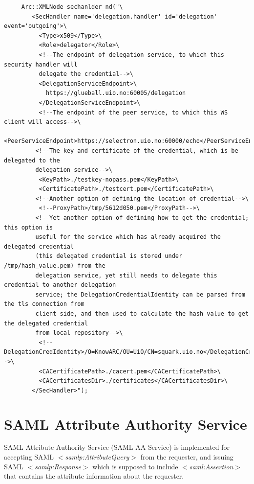 \documentclass{article}                            %
\begin{document}
\begin{verbatim}
     Arc::XMLNode sechanlder_nd("\ 
        <SecHandler name='delegation.handler' id='delegation' event='outgoing'>\ 
          <Type>x509</Type>\ 
          <Role>delegator</Role>\ 
          <!--The endpoint of delegation service, to which this security handler will 
          delegate the credential-->\
          <DelegationServiceEndpoint>\
            https://glueball.uio.no:60005/delegation
          </DelegationServiceEndpoint>\ 
          <!--The endpoint of the peer service, to which this WS client will access-->\
          <PeerServiceEndpoint>https://selectron.uio.no:60000/echo</PeerServiceEndpoint>\ 
         <!--The key and certificate of the credential, which is be delegated to the 
         delegation service-->\
          <KeyPath>./testkey-nopass.pem</KeyPath>\ 
          <CertificatePath>./testcert.pem</CertificatePath>\ 
         <!--Another option of defining the location of credential-->\
          <!--ProxyPath>/tmp/5612d050.pem</ProxyPath-->\ 
         <!--Yet another option of defining how to get the credential; this option is 
         useful for the service which has already acquired the delegated credential 
         (this delegated credential is stored under /tmp/hash_value.pem) from the 
         delegation service, yet still needs to delegate this credential to another delegation 
         service; the DelegationCredentialIdentity can be parsed from the tls connection from 
         client side, and then used to calculate the hash value to get the delegated credential 
         from local repository-->\
          <!--DelegationCredIdentity>/O=KnowARC/OU=UiO/CN=squark.uio.no</DelegationCredIdentity-->\ 
          <CACertificatePath>./cacert.pem</CACertificatePath>\ 
          <CACertificatesDir>./certificates</CACertificatesDir>\ 
        </SecHandler>"); 
\end{verbatim}




\section{SAML Attribute Authority Service} %
\label{sec:saml_aa_service}
SAML Attribute Authority Service (SAML AA Service) is implemented for accepting SAML \textit{$<$samlp:AttributeQuery$>$} from the requester, and issuing SAML \textit{$<$samlp:Response$>$} which is supposed to include \textit{$<$saml:Assertion$>$} that contains the attribute information about the requester.
\end{document}
